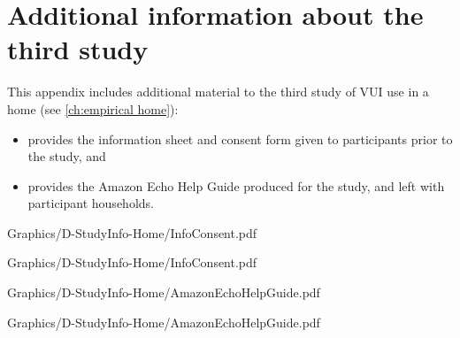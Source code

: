 


\chapter{Additional information about the third study}\label{app:studyinfo-home}



This appendix includes additional material to the third study of \acf{VUI} use in a home (see \autoref{ch:empirical home}):

\begin{itemize}
    \item {} provides the information sheet and consent form given to participants prior to the study, and
    \item {} provides the Amazon Echo Help Guide produced for the study, and left with participant households.
\end{itemize}







    {Graphics/D-StudyInfo-Home/InfoConsent.pdf}

    {Graphics/D-StudyInfo-Home/InfoConsent.pdf}







    {Graphics/D-StudyInfo-Home/AmazonEchoHelpGuide.pdf}

    {Graphics/D-StudyInfo-Home/AmazonEchoHelpGuide.pdf}



